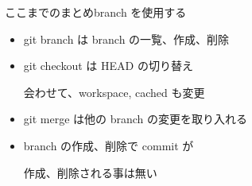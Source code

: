 
\begin{frame}[t]{ここまでのまとめ}{branch を使用する}

  \begin{itemize}
  \item git branch は branch の一覧、作成、削除
    \vspace{2ex}

  \item git checkout は HEAD の切り替え

    会わせて、workspace, cached も変更
    \vspace{2ex}

  \item git merge は他の branch の変更を取り入れる
    \vspace{2ex}

  \item branch の作成、削除で commit が

    作成、削除される事は無い
  \end{itemize}

\end{frame}
